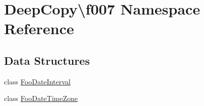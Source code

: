 \hypertarget{namespace_deep_copy_1_1f007}{}\section{Deep\+Copy\textbackslash{}f007 Namespace Reference}
\label{namespace_deep_copy_1_1f007}
\subsection*{Data Structures}
\begin{DoxyCompactItemize}
\item 
class \mbox{\hyperlink{class_deep_copy_1_1f007_1_1_foo_date_interval}{Foo\+Date\+Interval}}
\item 
class \mbox{\hyperlink{class_deep_copy_1_1f007_1_1_foo_date_time_zone}{Foo\+Date\+Time\+Zone}}
\end{DoxyCompactItemize}
